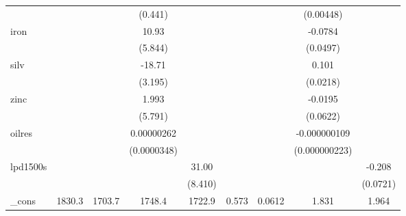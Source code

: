 {\begin{tabular}{l*{8}{c}}
            &                     &                     &     (0.441)         &                     &                     &                     &   (0.00448)         &                     \\
[1em]
iron        &                     &                     &       10.93\sym{*}  &                     &                     &                     &     -0.0784         &                     \\
            &                     &                     &     (5.844)         &                     &                     &                     &    (0.0497)         &                     \\
[1em]
silv        &                     &                     &      -18.71\sym{***}&                     &                     &                     &       0.101\sym{***}&                     \\
            &                     &                     &     (3.195)         &                     &                     &                     &    (0.0218)         &                     \\
[1em]
zinc        &                     &                     &       1.993         &                     &                     &                     &     -0.0195         &                     \\
            &                     &                     &     (5.791)         &                     &                     &                     &    (0.0622)         &                     \\
[1em]
oilres      &                     &                     &  0.00000262         &                     &                     &                     &-0.000000109         &                     \\
            &                     &                     & (0.0000348)         &                     &                     &                     &(0.000000223)         &                     \\
[1em]
lpd1500s    &                     &                     &                     &       31.00\sym{***}&                     &                     &                     &      -0.208\sym{***}\\
            &                     &                     &                     &     (8.410)         &                     &                     &                     &    (0.0721)         \\
[1em]
\_cons      &      1830.3\sym{***}&      1703.7\sym{***}&      1748.4\sym{***}&      1722.9\sym{***}&       0.573         &      0.0612         &       1.831\sym{***}&       1.964\sym{***}\\

\end{tabular}}
